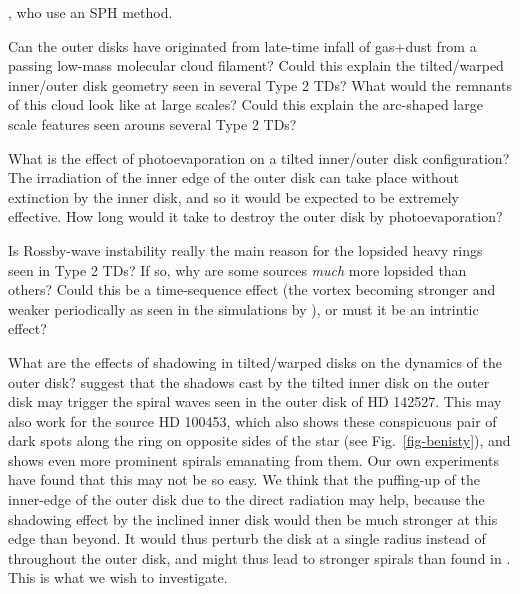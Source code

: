 \documentclass[10pt,fleqn,twoside]{article}
\begin{document}
\begin{compactenumerate}
  \citet{2017MNRAS.464.1449R}, who use an SPH method.
\item Can the outer disks have originated from late-time infall of gas+dust
  from a passing low-mass molecular cloud filament? Could this explain the
  tilted/warped inner/outer disk geometry seen in several Type 2 TDs? What
  would the remnants of this cloud look like at large scales? Could this
  explain the arc-shaped large scale features seen arouns several Type 2
  TDs?
\item What is the effect of photoevaporation on a tilted inner/outer disk
  configuration? The irradiation of the inner edge of the outer disk can
  take place without extinction by the inner disk, and so it would be
  expected to be extremely effective. How long would it take to destroy
  the outer disk by photoevaporation?
\item Is Rossby-wave instability really the main reason for the lopsided
  heavy rings seen in Type 2 TDs? If so, why are some sources {\em much}
  more lopsided than others? Could this be a time-sequence effect (the
  vortex becoming stronger and weaker periodically as seen in the
  simulations by \citet{2012MNRAS.419.1701R}), or must it be an intrintic
  effect?
\item What are the effects of shadowing in tilted/warped disks on the
  dynamics of the outer disk? \citet{2016ApJ...823L...8M} suggest that the
  shadows cast by the tilted inner disk on the outer disk may trigger the
  spiral waves seen in the outer disk of HD 142527. This may also work for
  the source HD 100453, which also shows these conspicuous pair of dark
  spots along the ring on opposite sides of the star (see
  Fig.~\ref{fig-benisty}), and shows even more prominent spirals emanating
  from them. Our own experiments have found that this may not be so easy. We
  think that the puffing-up of the inner-edge of the outer disk due to the
  direct radiation may help, because the shadowing effect by the inclined
  inner disk would then be much stronger at this edge than beyond.  It would
  thus perturb the disk at a single radius instead of throughout the outer
  disk, and might thus lead to stronger spirals than found in
  \citet{2016ApJ...823L...8M}. This is what we wish to investigate.
\end{compactenumerate}
\end{document}
